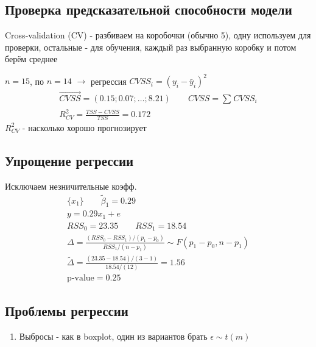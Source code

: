 \documentclass{article}
\begin{document}
\subsection{Проверка предсказательной способности модели}
Cross-validation (CV) - разбиваем на коробочки (обычно 5), одну используем для проверки,
остальные - для обучения, каждый раз выбранную коробку и потом берём среднее
\begin{eg}
  $n=15$, по $n = 14$ $\rightarrow$ регрессия $CVSS_i=(y_i - \bar{y}_i)^{2}$
  \begin{gather*}
    \vec{CVSS}=(0.15;0.07; \dots ; 8.21) \qquad CVSS=\sum_{}^{}CVSS_i \\ 
    R^{2}_{CV}=\frac{TSS-CVSS}{TSS}=0.172
  \end{gather*}
  $R^{2}_{CV}$ - насколько хорошо прогнозирует
\end{eg}
\subsection{Упрощение регрессии}
Исключаем незничительные коэфф.
\begin{gather*}
  \{x_1\} \qquad \tilde{\beta}_1=0.29 \\ 
  y=0.29x_1 + e \\ 
  RSS_0=23.35 \qquad RSS_1=18.54 \\
  \Delta=\frac{(RSS_0-RSS_1)/(p_1-p_0)}{RSS_1/(n-p_1)} \sim F(p_1-p_0, n-p_1) \\ 
  \tilde{\Delta} = \frac{(23.35-18.54)/(3-1)}{18.54 / (12)} = 1.56 \\ 
  \text{p-value} = 0.25 
\end{gather*}

\subsection{Проблемы регрессии}
\begin{enumerate}
  \item Выбросы - как в boxplot, один из вариантов брать $\epsilon \sim t(m)$
\end{enumerate}
\end{document}
